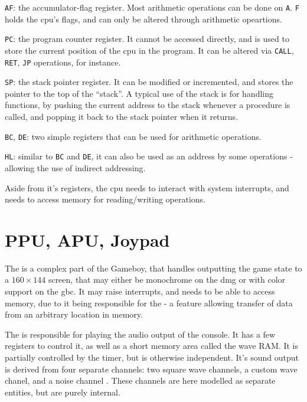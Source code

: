 \documentclass[11pt]{informatics-report}
\begin{document}
\begin{compactitem}
	\item \texttt{AF}: the accumulator-flag register. Most arithmetic operations can be done on \texttt{A}. \texttt{F} holds the \gls{cpu}'s flags, and can only be altered through arithmetic opeartions.
	\item \texttt{PC}: the program counter register. It cannot be accessed directly, and is used to store the current position of the \gls{cpu} in the program. It can be altered via \texttt{CALL}, \texttt{RET}, \texttt{JP} operations, for instance.
	\item \texttt{SP}: the stack pointer register. It can be modified or incremented, and stores the pointer to the top of the ``stack''. A typical use of the stack is for handling functions, by pushing the current address to the stack whenever a procedure is called, and popping it back to the stack pointer when it returns.
	\item \texttt{BC}, \texttt{DE}: two simple registers that can be used for arithmetic operations.
	\item \texttt{HL}: similar to \texttt{BC} and \texttt{DE}, it can also be used as an address by some operations - allowing the use of indirect addressing.
\end{compactitem}

Aside from it's registers, the \gls{cpu} needs to interact with system interrupts, and needs to access memory for reading/writing operations.

\section{PPU, APU, Joypad}

The  is a complex part of the Gameboy, that handles outputting the game state to a $160 \times 144$ screen, that may either be monochrome on the \gls{dmg} or with color support on the \gls{gbc}. It may raise interrupts, and needs to be able to access memory, due to it being responsible for the  - a feature allowing transfer of data from an arbitrary location in memory.

The  is responsible for playing the audio output of the console. It has a few registers to control it, as well as a short memory area called the wave RAM. It is partially controlled by the timer, but is otherwise independent. It's sound output is derived from four separate channels: two square wave channels, a custom wave chanel, and a noise channel \cite[Audio]{pandoc}. These channels are here modelled as separate entities, but are purely internal.
\end{document}

